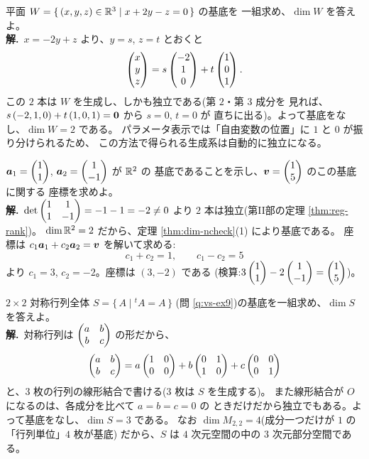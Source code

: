 \begin{rei}[例題・基本(解空間の基底)]\label{rei:dim-plane}
平面 $W = \{\,(x, y, z) \in \mathbb{R}^3 \mid x + 2y - z = 0\,\}$ の基底を
一組求め、$\dim W$ を答えよ。\\
\textbf{解.}\ $x = -2y + z$ より、$y = s$, $z = t$ とおくと
\[
\begin{pmatrix}x \\ y \\ z\end{pmatrix} = s\begin{pmatrix}-2 \\ 1 \\ 0\end{pmatrix} + t\begin{pmatrix}1 \\ 0 \\ 1\end{pmatrix}.
\]
この $2$ 本は $W$ を生成し、しかも独立である(第 $2$・第 $3$ 成分を
見れば、$s\,(-2,1,0) + t\,(1,0,1) = \bm{0}$ から $s = 0$, $t = 0$ が
直ちに出る)。よって基底をなし、$\dim W = 2$ である。
パラメータ表示では「自由変数の位置」に $1$ と $0$ が振り分けられるため、
この方法で得られる生成系は自動的に独立になる。
\end{rei}

\begin{rei}[例題・基本(基底の判定と座標)]\label{rei:dim-coord}
$\bm{a}_1 = \begin{pmatrix}1 \\ 1\end{pmatrix}$, $\bm{a}_2 = \begin{pmatrix}1 \\ -1\end{pmatrix}$ が $\mathbb{R}^2$ の
基底であることを示し、$\bm{v} = \begin{pmatrix}1 \\ 5\end{pmatrix}$ のこの基底に関する
座標を求めよ。\\
\textbf{解.}\ $\det \begin{pmatrix}1 & 1 \\ 1 & -1\end{pmatrix} = -1 - 1 = -2 \neq 0$ より
$2$ 本は独立(第II部の定理 \ref{thm:reg-rank})。
$\dim \mathbb{R}^2 = 2$ だから、定理 \ref{thm:dim-ncheck}(1) により基底である。
座標は $c_1\bm{a}_1 + c_2\bm{a}_2 = \bm{v}$ を解いて求める:
\[
c_1 + c_2 = 1, \qquad c_1 - c_2 = 5
\]
より $c_1 = 3$, $c_2 = -2$。座標は $(3, -2)$ である
(検算:$3\begin{pmatrix}1\\1\end{pmatrix} - 2\begin{pmatrix}1\\-1\end{pmatrix} = \begin{pmatrix}1\\5\end{pmatrix}$)。
\end{rei}

\begin{rei}[例題・基本(行列の空間の次元)]\label{rei:dim-sym}
$2 \times 2$ 対称行列全体 $S = \{\, A \mid {}^t\!A = A \,\}$
(問 \ref{q:vs-ex9})の基底を一組求め、$\dim S$ を答えよ。\\
\textbf{解.}\ 対称行列は $\begin{pmatrix}a & b \\ b & c\end{pmatrix}$ の形だから、
\[
\begin{pmatrix}a & b \\ b & c\end{pmatrix}
= a\begin{pmatrix}1 & 0 \\ 0 & 0\end{pmatrix} + b\begin{pmatrix}0 & 1 \\ 1 & 0\end{pmatrix} + c\begin{pmatrix}0 & 0 \\ 0 & 1\end{pmatrix}
\]
と、$3$ 枚の行列の線形結合で書ける($3$ 枚は $S$ を生成する)。
また線形結合が $O$ になるのは、各成分を比べて $a = b = c = 0$ の
ときだけだから独立でもある。よって基底をなし、$\dim S = 3$ である。
なお $\dim M_{2,2} = 4$(成分一つだけが $1$ の「行列単位」$4$ 枚が基底)
だから、$S$ は $4$ 次元空間の中の $3$ 次元部分空間である。
\end{rei}

